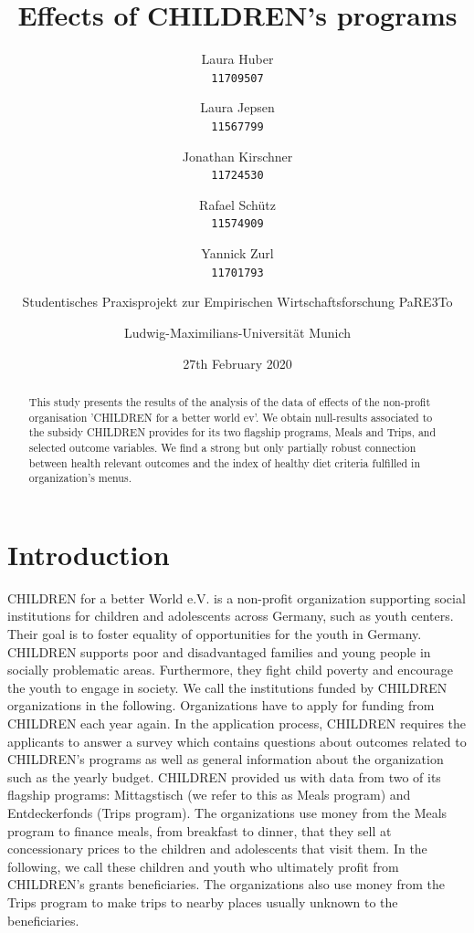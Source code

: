 \documentclass[12pt, a4paper, titlepage]{article}\usepackage[]{graphicx}\usepackage[]{color}
\title{Effects of CHILDREN's programs}
\author{
Laura Huber\\
\texttt{11709507}
\and
Laura Jepsen\\
\texttt{11567799}
\and
Jonathan Kirschner\\
\texttt{11724530}
\and
Rafael Schütz\\
\texttt{11574909} 
\and 
Yannick Zurl\\
\texttt{11701793}
\and
Studentisches Praxisprojekt zur Empirischen Wirtschaftsforschung PaRE3To\\
\and
Ludwig-Maximilians-Universität Munich
}
\date{27th February 2020}
\begin{document}
\maketitle

\tableofcontents
\listoftables

\listoffigures

\begin{abstract} 
This study presents the results of the analysis of the data of effects of the non-profit organisation 'CHILDREN for a better world ev'. We obtain null-results associated to the subsidy CHILDREN provides for its two flagship programs, Meals and Trips, and selected outcome variables. We find a strong but only partially robust connection between health relevant outcomes and the index of healthy diet criteria fulfilled in organization's menus. 
\end{abstract}

\section{Introduction}

CHILDREN for a better World e.V. is a non-profit organization supporting social institutions for children and adolescents across Germany, such as youth centers. Their goal is to foster equality of opportunities for the youth in Germany. CHILDREN supports poor and disadvantaged families and young people in socially problematic areas. Furthermore, they fight child poverty and encourage the youth to engage in society. We call the institutions funded by CHILDREN organizations in the following. Organizations have to apply for funding from CHILDREN each year again. In the application process, CHILDREN requires the applicants to answer a survey which contains questions about outcomes related to CHILDREN’s programs as well as general information about the organization such as the yearly budget.
CHILDREN provided us with data from two of its flagship programs: Mittagstisch (we refer to this as Meals program) and Entdeckerfonds (Trips program). The organizations use money from the Meals program to finance meals, from breakfast to dinner, that they sell at concessionary prices to the children and adolescents that visit them. In the following, we call these children and youth who ultimately profit from CHILDREN's grants beneficiaries. The organizations also use money from the Trips program to make trips to nearby places usually unknown to the beneficiaries.  
\end{document}

